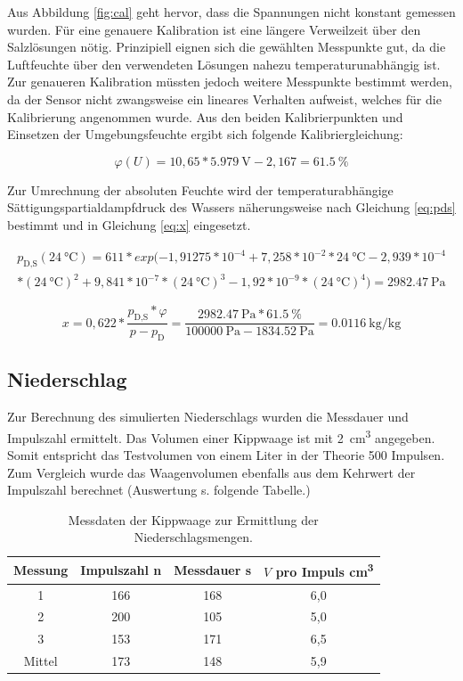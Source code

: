 Aus Abbildung \ref{fig:cal} geht hervor, dass die Spannungen nicht konstant gemessen wurden. Für eine genauere Kalibration ist eine längere Verweilzeit über den Salzlösungen nötig. Prinzipiell eignen sich die gewählten Messpunkte gut, da die Luftfeuchte über den verwendeten Lösungen nahezu temperaturunabhängig ist. Zur genaueren Kalibration müssten jedoch weitere Messpunkte bestimmt werden, da der Sensor nicht zwangsweise ein lineares Verhalten aufweist, welches für die Kalibrierung angenommen wurde. Aus den beiden Kalibrierpunkten und Einsetzen der Umgebungsfeuchte ergibt sich folgende Kalibriergleichung:

\begin{equation}
	\label{eq:cal}
	\varphi(U)=10,65*\SI{5,979}{\volt}-2,167=\SI{61,5}{\percent}
\end{equation}

Zur Umrechnung der absoluten Feuchte wird der temperaturabhängige Sättigungspartialdampfdruck des Wassers näherungsweise nach Gleichung \ref{eq:pds} bestimmt und in Gleichung \ref{eq:x} eingesetzt. 

\begin{multline}
	\label{eq:pds}
	p_{\text{D,S}}(\SI{24}{\celsius}) = 611*exp(-1,91275*10^{-4}+7,258*10^{-2}*\SI{24}{\celsius}-2,939*10^{-4}\\*(\SI{24}{\celsius})^2 +9,841*10^{-7}*(\SI{24}{\celsius})^3-1,92*10^{-9}*(\SI{24}{\celsius})^4)=\SI{2982,47}{\pascal}
\end{multline}

\begin{equation}
	\label{eq:x}
	x=0,622*\frac{p_{\text{D,S}}*\varphi}{p-p_{\text{D}}}=\frac{\SI{2982,47}{\pascal}*\SI{61,5}{\percent}}{\SI{100000}{\pascal}-\SI{1834,52}{\pascal}}=\SI{0,0116}{\kilogram\per\kilogram}
\end{equation}

		
\subsection{Niederschlag}
Zur Berechnung des simulierten Niederschlags wurden die Messdauer und Impulszahl ermittelt. Das Volumen einer Kippwaage ist mit \SI{2}{\cubic\centi\meter} angegeben. Somit entspricht das Testvolumen von einem Liter in der Theorie 500 Impulsen. Zum Vergleich wurde das Waagenvolumen ebenfalls aus dem Kehrwert der Impulszahl berechnet (Auswertung s. folgende Tabelle.)

 \begin{table}
 	\centering
 	\caption{Messdaten der Kippwaage zur Ermittlung der Niederschlagsmengen.}
 	\begin{tabular}{cccc}
 		\label{tab:rain}
 		\textbf{Messung} & \textbf{Impulszahl} n & \textbf{Messdauer} s & \textbf{$V$ pro Impuls} \si{\cubic\centi\meter}\\
 		\hline
 		1 & 166 & 168  & 6,0\\
 		2 & 200 & 105  & 5,0\\
 		3 & 153 & 171  & 6,5\\
 		Mittel & 173 & 148  & 5,9
 	\end{tabular}
 \end{table}

